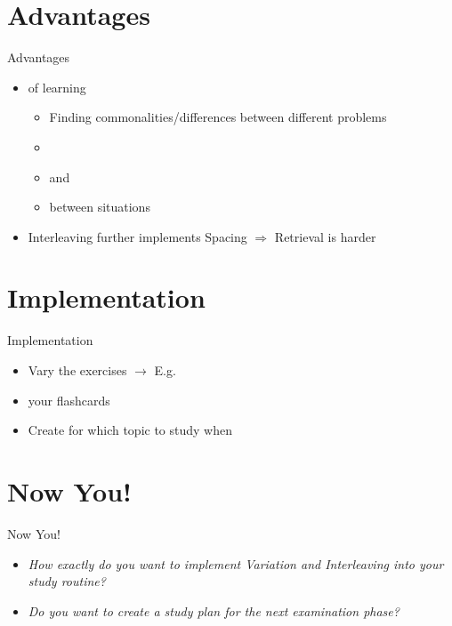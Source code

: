 \documentclass{ercisbeamer}
\begin{document}
\section{Advantages}
\begin{frame}{Advantages}
    \begin{itemize}
        \item {} of learning
        \begin{itemize}
            \item Finding commonalities/differences between different problems
            \item {}
            \item {} and 
            \item {} between situations
        \end{itemize}
        \item Interleaving further implements Spacing $\Rightarrow$ Retrieval is harder
    \end{itemize}
\end{frame}


\section{Implementation}
\begin{frame}{Implementation}
    \begin{itemize}
        \item Vary the exercises $\rightarrow$ E.g. 
        \item {} your flashcards
        \item Create  for which topic to study when 
    \end{itemize}
\end{frame}


\section{Now You!}
\begin{frame}{Now You!}
    \begin{itemize}
        \item \emph{How exactly do you want to implement Variation and Interleaving into your study routine?}
        \item \emph{Do you want to create a study plan for the next examination phase?}
    \end{itemize}
\end{frame}
\end{document}
